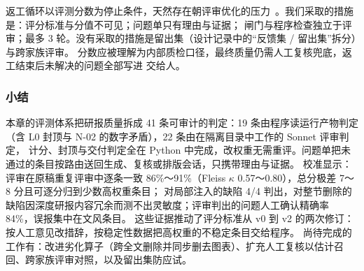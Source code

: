 \begin{tradeoff}[：返工循环与古德哈特效应]
返工循环以评测分数为停止条件，天然存在朝评审优化的压力~\citep{manheim2018goodhart}。我们采取的措施是：评分标准与分值不可见；问题单只有理由与证据；
闸门与程序检查独立于评审；最多 3 轮。没有采取的措施是留出集（设计记录中的“反馈集 / 留出集”拆分）与跨家族评审。
分数应被理解为内部质检口径，最终质量仍需人工复核兜底，返工结束后未解决的问题全部写进  交给人。
\end{tradeoff}

\subsubsection{小结}

本章的评测体系把研报质量拆成 41 条可审计的判定：19 条由程序读运行产物判定（含 L0 封顶与 N-02 的数字矛盾），22 条由在隔离目录中工作的 Sonnet 评审判定，
计分、封顶与交付判定全在 Python 中完成，改权重无需重评。问题单把未通过的条目按路由送回生成、复核或排版会话，只携带理由与证据。
校准显示：评审在原稿重复评审中逐条一致 86\%～91\%（Fleiss $\kappa$ 0.57～0.80），总分极差 7～8 分且可逐分归到少数高权重条目；
对局部注入的缺陷 4/4 判出，对整节删除的缺陷因深度研报内容冗余而测不出灵敏度；评审判出的问题人工确认精确率 84\%，误报集中在文风条目。
这些证据推动了评分标准从 v0 到 v2 的两次修订：按人工意见改措辞，按稳定性数据把高权重的不稳定条目交给程序。
尚待完成的工作有：改进劣化算子（跨全文删除并同步删去图表）、扩充人工复核以估计召回、跨家族评审对照，以及留出集防应试。
